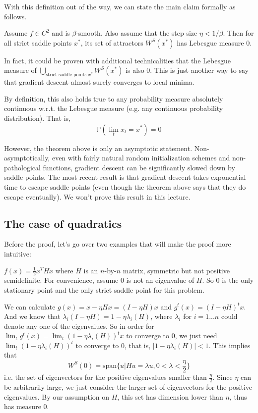 With this definition out of the way, we can state the main claim formally as
follows.

\begin{theorem}
Assume $f\in C^2$ and is $\beta$-smooth. Also assume that the step size $\eta <
1/\beta$. Then for all strict saddle points $x^*$, its set of attractors
$W^S(x^*)$ has Lebesgue measure $0$.
\end{theorem}

\begin{remark}
In fact, it could be proven with additional technicalities that the Lebesgue measure of 
$
\bigcup_{\text{strict saddle points }x^*} W^S(x^*)
$
is also 0. This is just another way to say that gradient descent almost surely converges to local minima. 
\end{remark}

\begin{remark}
By definition, this also holds true to any probability measure absolutely continuous w.r.t. the Lebesgue measure (e.g. any continuous probability distribution). That is,
$$\mathbb{P}(\lim_t x_t = x^*) = 0$$
\end{remark}

However, the theorem above is only an asymptotic statement. Non-asymptotically, even with fairly natural random initialization schemes and non-pathological functions, gradient descent can be significantly slowed down by saddle points. 
The most recent result \cite{du2017gradient} is that gradient descent takes exponential time to escape saddle points (even though the theorem above says that they do escape eventually). We won't prove this result in this lecture.

\subsection{The case of quadratics}
Before the proof, let's go over two examples that will make the proof more intuitive:

\begin{example}
$f(x) = \frac{1}{2} x^THx$ where $H$ is an $n$-by-$n$ matrix, symmetric but not positive semidefinite. 
For convenience, assume $0$ is not an eigenvalue of $H$.
So $0$ is the only stationary point and the only strict saddle point for this problem.

We can calculate
$g(x) = x - \eta Hx = (I-\eta H)x$ and 
$g^t(x) = (I-\eta H)^tx$. 
And we know that 
$\lambda_i(I - \eta H) = 
1-\eta \lambda_i(H)$, where $\lambda_i$ for $i=1...n$ could denote any one of the eigenvalues.
So in order for $\lim_t g^t(x) = \lim_t (1-\eta \lambda_i(H))^t x$ to converge to 0, we just need $\lim_t (1-\eta \lambda_i(H))^t$ to converge to 0, that is, $|1-\eta \lambda_i(H)| < 1$. This implies that
$$W^S(0) = \text{span}\bigg\{ u| Hu=\lambda u,  0< \lambda < \frac{\eta}{2} \bigg\}$$
i.e. the set of eigenvectors for the positive eigenvalues smaller than 
$\frac{\eta}{2}$. Since $\eta$ can be arbitrarily large, we just consider the larger set of eigenvectors for the positive eigenvalues. By our assumption on $H$, this set has dimension lower than $n$, thus has measure 0.
\end{example}

